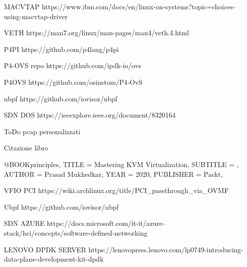 MACVTAP https://www.ibm.com/docs/en/linux-on-systems?topic=choices-using-macvtap-driver

VETH https://man7.org/linux/man-pages/man4/veth.4.html

P4PI https://github.com/p4lang/p4pi

P4-OVS repo https://github.com/ipdk-io/ovs

P4OVS https://github.com/osinstom/P4-OvS

ubpf https://github.com/iovisor/ubpf

SDN DOS https://ieeexplore.ieee.org/document/8320164

ToDo 
pcap personalizzati


Citazione libro

@BOOK{principles,
  TITLE = {Mastering KVM Virtualization},
  SUBTITLE = {},
  AUTHOR = {Prasad Mukhedkar},
  YEAR = {2020}, 
  PUBLISHER = {Packt},
}


VFIO PCI https://wiki.archlinux.org/title/PCI\_passthrough\_via\_OVMF

Ubpf https://github.com/iovisor/ubpf

SDN AZURE https://docs.microsoft.com/it-it/azure-stack/hci/concepts/software-defined-networking

LENOVO DPDK SERVER https://lenovopress.lenovo.com/lp0749-introducing-data-plane-development-kit-dpdk